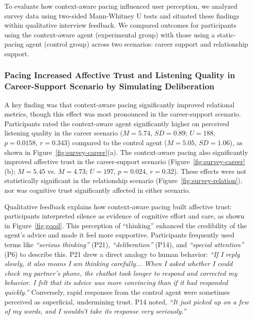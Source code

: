 To evaluate how context-aware pacing influenced user perception, we analyzed survey data using two-sided Mann-Whitney U tests and situated these findings within qualitative interview feedback. We compared outcomes for participants using the context-aware agent (experimental group) with those using a static-pacing agent (control group) across two scenarios: career support and relationship support.

\subsubsection{Pacing Increased Affective Trust and Listening Quality in Career-Support Scenario by Simulating Deliberation}
\label{subsubsec:aff_lis}
A key finding was that context-aware pacing significantly improved relational metrics, though this effect was most pronounced in the career-support scenario. Participants rated the context-aware agent significantly higher on perceived listening quality in the career scenario ($M=5.74$, $SD=0.89$; $U=188$, $p=0.0158$, $r=0.343$) compared to the control agent ($M=5.05$, $SD=1.06$), as shown in Figure~\ref{fig:survey-career}(a). The context-aware pacing also significantly improved affective trust in the career-support scenario (Figure~\ref{fig:survey-career}(b); $M=5.45$ vs. $M=4.73$; $U=197$, $p=0.024$, $r=0.32$).
These effects were not statistically significant in the relationship scenario (Figure~\ref{fig:survey-relation}), nor was cognitive trust significantly affected in either scenario.

Qualitative feedback explains how context-aware pacing built affective trust: participants interpreted silence as evidence of cognitive effort and care, as shown in Figure~\ref{fig:good}. This perception of ``thinking'' enhanced the credibility of the agent's advice and made it feel more supportive. Participants frequently used terms like \textit{``serious thinking''} (P21), \textit{``deliberation''} (P14), and \textit{``special attention''} (P6) to describe this. P21 drew a direct analogy to human behavior: \textit{``If I reply slowly, it also means I am thinking carefully... When I asked whether I could check my partner's phone, the chatbot took longer to respond and corrected my behavior. I felt that its advice was more convincing than if it had responded quickly.''} Conversely, rapid responses from the control agent were sometimes perceived as superficial, undermining trust. P14 noted, \textit{``It just picked up on a few of my words, and I wouldn't take its response very seriously.''}


